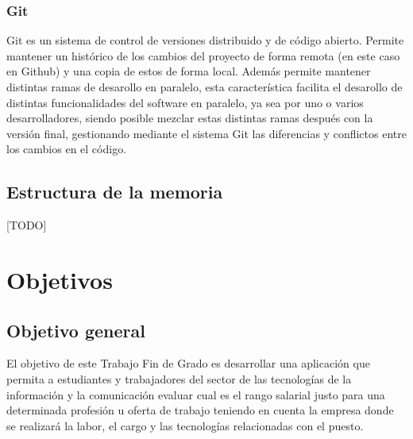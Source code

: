 \documentclass[a4paper, 12pt]{book}
\begin{document}
\subsection{Git}
\label{subsec:intro_tools_git}
Git es un sistema de control de versiones distribuido y de código abierto. Permite mantener un histórico de los cambios del proyecto de forma remota (en este caso en Github) y una copia de estos de forma local. Además permite mantener distintas ramas de desarollo en paralelo, esta característica facilita el desarollo de distintas funcionalidades del software en paralelo, ya sea por uno o varios desarrolladores, siendo posible mezclar estas distintas ramas después con la versión final, gestionando mediante el sistema Git las diferencias y conflictos entre los cambios en el código.

\section{Estructura de la memoria}
\label{sec:intro_memorystructure}
[TODO]



\cleardoublepage %
\chapter{Objetivos} %
\label{chap:targets} %

\section{Objetivo general} %
\label{sec:targets_generaltarget} %

El objetivo de este Trabajo Fin de Grado es desarrollar una aplicación que permita a estudiantes y trabajadores del sector de las tecnologías de la información y la comunicación evaluar cual es el rango salarial justo para una determinada profesión u oferta de trabajo teniendo en cuenta la empresa donde se realizará la labor, el cargo y las tecnologías relacionadas con el puesto.
\end{document}
